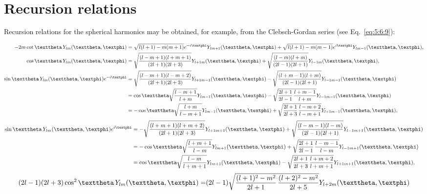\section{Recursion relations}\label{sec:5.7}
Recursion relations for the spherical harmonics may be obtained, for example, from the Clebsch-Gordan series (see Eq.~\eqref{eq:5:6:9}):
\begin{fleqn}
\begin{align}
-2 m \cot \vartheta\,Y_{l m}(\vartheta, \varphi) & =\sqrt{l(l+1)-m(m+1)} e^{-i \varphi} Y_{l m+1}(\vartheta, \varphi)+\sqrt{l(l+1)-m(m-1)} e^{i \varphi} Y_{l m-1}(\vartheta, \varphi),  \label{eq:5:7:1}\\
\cos \vartheta\, Y_{l m}(\vartheta, \varphi) & =\sqrt{\frac{(l-m+1)(l+m+1)}{(2 l+1)(2 l+3)}} Y_{l+1 m}(\vartheta, \varphi)+\sqrt{\frac{(l-m)(l+m)}{(2 l-1)(2 l+1)}} Y_{l-1 m}(\vartheta, \varphi),  \label{eq:5:7:2}\\
\sin \vartheta\, Y_{l m}(\vartheta, \varphi) e^{-i \varphi} & =\sqrt{\frac{(l-m+1)(l-m+2)}{(2 l+1)(2 l+3)}} Y_{l+1 m-1}(\vartheta, \varphi)-\sqrt{\frac{(l+m-1)(l+m)}{(2 l-1)(2 l+1)}} Y_{l-1 m-1}(\vartheta, \varphi)  \notag\\
& =\cos \vartheta \sqrt{\frac{l-m+1}{l+m}} Y_{l m-1}(\vartheta, \varphi)-\sqrt{\frac{2 l+1}{2 l-1} \, \frac{l+m-1}{l+m}} Y_{l-1 m-1}(\vartheta, \varphi)  \notag\\
& =-\cos \vartheta \sqrt{\frac{l+m}{l-m+1}} Y_{l m-1}(\vartheta, \varphi)+\sqrt{\frac{2 l+1}{2 l+3} \, \frac{l-m+2}{l-m+1}} Y_{l+1 m-1}(\vartheta, \varphi), \label{eq:5:7:3}
\end{align}
\begin{align}
\sin \vartheta\, Y_{l m}(\vartheta, \varphi) e^{i \varphi} & =-\sqrt{\frac{(l+m+1)(l+m+2)}{(2 l+1)(2 l+3)}} Y_{l+1 m+1}(\vartheta, \varphi)+\sqrt{\frac{(l-m-1)(l-m)}{(2 l-1)(2 l+1)}} Y_{l-1 m+1}(\vartheta, \varphi)  \notag\\
& =-\cos \vartheta \sqrt{\frac{l+m+1}{l-m}} Y_{l m+1}(\vartheta, \varphi)+\sqrt{\frac{2 l+1}{2 l-1} \, \frac{l-m-1}{l-m}} Y_{l-1 m+1}(\vartheta, \varphi)  \notag\\
& =\cos \vartheta \sqrt{\frac{l-m}{l+m+1}} Y_{l m+1}(\vartheta, \varphi)-\sqrt{\frac{2 l+1}{2 l+3} \, \frac{l+m+2}{l+m+1}} Y_{l+1 m+1}(\vartheta, \varphi), \label{eq:5:7:4}
\end{align}
\begin{align}
 (2 l-1)(2 l+3) \cos ^{2} \vartheta\, Y_{l m}(\vartheta, \varphi)=&(2 l-1) \sqrt{\frac{(l+1)^{2}-m^{2}}{2 l+1} \, \frac{(l+2)^{2}-m^{2}}{2 l+5}} Y_{l+2 m}(\vartheta, \varphi)  \notag \\

\end{align}
\end{fleqn}
